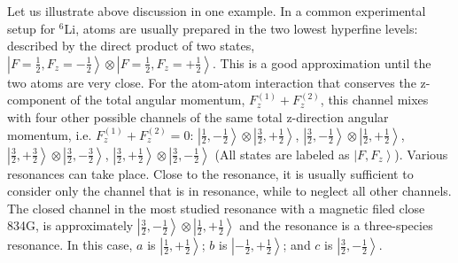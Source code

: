 \documentclass[reprint,pra]{revtex4-1}
\newcommand{\nth}[1]{\ensuremath{\frac{1}{#1}}}
\newcommand{\ket}[1]{\ensuremath{\left|#1\right>}}
\begin{document}
Let us illustrate above discussion in  one example.  In a common experimental setup for $^{6}$Li, atoms are usually  prepared in the two lowest hyperfine levels: described by the  direct product of two states, $\ket{F=\nth{2},F_{z}=-\nth{2}}\otimes\ket{F=\nth{2},F_{z}=+\nth{2}}$.  This is a good approximation until the two atoms are very close.  For the atom-atom interaction that  conserves the z-component of the total angular momentum, $F_{z}^{(1)}+F_{z}^{(2)}$, this channel mixes with four other possible channels of the same total z-direction angular momentum, i.e. $F_{z}^{(1)}+F_{z}^{(2)}=0$: $\ket{\nth{2},-\nth{2}}\otimes\ket{\frac{3}{2},+\nth{2}}$, $\ket{\frac{3}{2},-\nth{2}}\otimes\ket{\nth{2},+\nth{2}}$, $\ket{\frac{3}{2},+\frac{3}{2}}\otimes\ket{\frac{3}{2},-\frac{3}{2}}$, $\ket{\frac{3}{2},+\frac{1}{2}}\otimes\ket{\frac{3}{2},-\frac{1}{2}}$ (All states are labeled as $\ket{F,F_{z}}$).  Various resonances can take place. Close to the resonance, it is usually sufficient to consider only the  channel that is in resonance, while to neglect all other channels.  The closed channel in the most studied resonance with a magnetic filed close 834G, is approximately $\ket{\frac{3}{2},-\nth{2}}\otimes\ket{\nth{2},+\nth{2}}$ and the resonance is a three-species resonance\cite{ZhangThesis,ChinRMP}. In this case, $a$ is  $\ket{\nth{2},+\nth{2}}$; $b$ is $\ket{-\nth{2},+\nth{2}}$; and $c$ is $\ket{\frac{3}{2},-\nth{2}}$.
\end{document}
